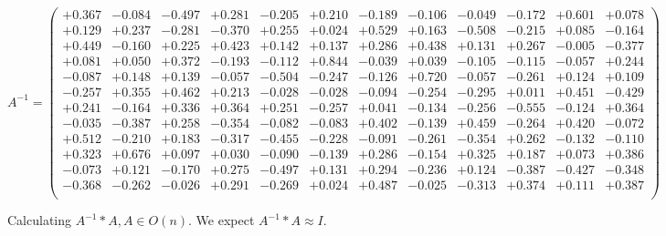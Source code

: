 \documentclass[9pt]{article}
\theoremstyle{plain}
\theoremstyle{definition}
\theoremstyle{remark}
\numberwithin{equation}{section}
\begin{document}
$A^{-1} = \left(
\begin{array}{
cccccccccccc}
+0.367 & -0.084 & -0.497 & +0.281 & -0.205 & +0.210 & -0.189 & -0.106 & -0.049 & -0.172 & +0.601 & +0.078 \\
+0.129 & +0.237 & -0.281 & -0.370 & +0.255 & +0.024 & +0.529 & +0.163 & -0.508 & -0.215 & +0.085 & -0.164 \\
+0.449 & -0.160 & +0.225 & +0.423 & +0.142 & +0.137 & +0.286 & +0.438 & +0.131 & +0.267 & -0.005 & -0.377 \\
+0.081 & +0.050 & +0.372 & -0.193 & -0.112 & +0.844 & -0.039 & +0.039 & -0.105 & -0.115 & -0.057 & +0.244 \\
-0.087 & +0.148 & +0.139 & -0.057 & -0.504 & -0.247 & -0.126 & +0.720 & -0.057 & -0.261 & +0.124 & +0.109 \\
-0.257 & +0.355 & +0.462 & +0.213 & -0.028 & -0.028 & -0.094 & -0.254 & -0.295 & +0.011 & +0.451 & -0.429 \\
+0.241 & -0.164 & +0.336 & +0.364 & +0.251 & -0.257 & +0.041 & -0.134 & -0.256 & -0.555 & -0.124 & +0.364 \\
-0.035 & -0.387 & +0.258 & -0.354 & -0.082 & -0.083 & +0.402 & -0.139 & +0.459 & -0.264 & +0.420 & -0.072 \\
+0.512 & -0.210 & +0.183 & -0.317 & -0.455 & -0.228 & -0.091 & -0.261 & -0.354 & +0.262 & -0.132 & -0.110 \\
+0.323 & +0.676 & +0.097 & +0.030 & -0.090 & -0.139 & +0.286 & -0.154 & +0.325 & +0.187 & +0.073 & +0.386 \\
-0.073 & +0.121 & -0.170 & +0.275 & -0.497 & +0.131 & +0.294 & -0.236 & +0.124 & -0.387 & -0.427 & -0.348 \\
-0.368 & -0.262 & -0.026 & +0.291 & -0.269 & +0.024 & +0.487 & -0.025 & -0.313 & +0.374 & +0.111 & +0.387 \\
\end{array}
\right)$ \newline 

Calculating $A^{-1} *A  ,  A \in O(n)$.   We expect $A^{-1} *A  \approx I$. 
\end{document}
